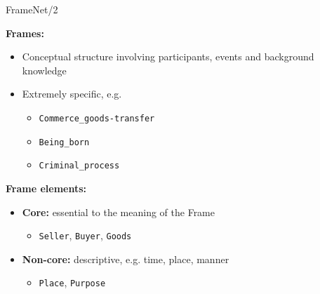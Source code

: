\documentclass[10pt, compress]{beamer}
\begin{document}
\begin{frame}{FrameNet/2}

\textbf{Frames:}
\begin{itemize}
  \item Conceptual structure involving participants, events and background knowledge
  \item Extremely specific, e.g. 
  \begin{itemize}
    \item \texttt{Commerce\_goods-transfer}
    \item \texttt{Being\_born}
    \item \texttt{Criminal\_process}
  \end{itemize}
\end{itemize}

\textbf{Frame elements:}
\begin{itemize}
  \item \textbf{Core:} essential to the meaning of the Frame
  \begin{itemize}
    \item \texttt{Seller}, \texttt{Buyer}, \texttt{Goods} 
  \end{itemize}
  
  \item \textbf{Non-core:} descriptive, e.g. time, place, manner 
  \begin{itemize}
     \item \texttt{Place}, \texttt{Purpose} 
  \end{itemize}
\end{itemize}

\end{frame}
\end{document}
